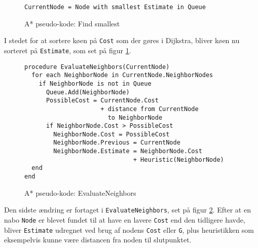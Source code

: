 \begin{figure}[H]
\begin{lstlisting}
CurrentNode = Node with smallest Estimate in Queue
\end{lstlisting}
\caption{A* pseudo-kode: Find smallest}\label{AStarCodeFindSmallest}
\end{figure}

I stedet for at sortere køen på \texttt{Cost} som der gøres i Dijkstra, bliver køen nu sorteret på \texttt{Estimate}, som set på figur \ref{AStarCodeFindSmallest}.

\begin{figure}[H]
\begin{lstlisting}
procedure EvaluateNeighbors(CurrentNode)
  for each NeighborNode in CurrentNode.NeighborNodes
    if NeighborNode is not in Queue
      Queue.Add(NeighborNode)
      PossibleCost = CurrentNode.Cost 
                     + distance from CurrentNode
                       to NeighborNode
      if NeighborNode.Cost > PossibleCost
        NeighborNode.Cost = PossibleCost
        NeighborNode.Previous = CurrentNode
        NeighborNode.Estimate = NeighborNode.Cost
                              + Heuristic(NeighborNode)
  end
end
\end{lstlisting}
\caption{A* pseudo-kode: EvaluateNeighbors}\label{AStarCodeEvaluateNeighbors}
\end{figure}

Den sidste ændring er fortaget i \texttt{EvaluateNeighbors}, set på figur \ref{AStarCodeEvaluateNeighbors}. Efter at en nabo \texttt{Node} er blevet fundet til at have en lavere \texttt{Cost} end den tidligere havde, bliver \texttt{Estimate} udregnet ved brug af nodens \texttt{Cost} eller \texttt{G}, plus heuristikken som eksempelvis kunne være distancen fra noden til slutpunktet.